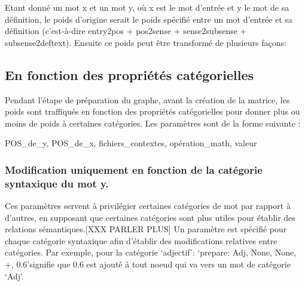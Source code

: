 Etant donné un mot x et un mot y, où x est le mot d'entrée et y le mot de sa 
définition, le poids d'origine serait le poids spécifié entre un mot d'entrée et 
sa définition (c'est-à-dire entry2pos + pos2sense + sense2subsense + 
subsense2deftext). Ensuite ce poids peut être transformé de plusieurs façons:


\subsection{En fonction des propriétés catégorielles}
Pendant l'étape de préparation du graphe, avant la création de la matrice, les 
poids sont traffiqués en fonction des propriétés catégorielles pour donner plus 
ou moins de poids à certaines catégories. Les paramètres sont de la forme 
suivante :
    \begin{framed}
        POS\_de\_y, POS\_de\_x, fichiers\_contextes, opération\_math, valeur
    \end{framed}

\subsubsection{Modification uniquement en fonction de la catégorie 
syntaxique du mot y.}
Ces paramètres servent à privilégier certaines catégories de mot par rapport à 
d'autres, en supposant que certaines catégories sont plus utiles pour établir 
des relations sémantiques.[XXX PARLER PLUS] Un paramètre est spécifié pour 
chaque catégorie syntaxique afin d'établir des modifications relatives entre 
catégories. Par exemple, pour la catégorie \lq{adjectif}\rq: \lq{prepare: Adj, 
None, None, +, 0.6}\rq signifie que 0.6 est ajouté à tout noeud qui va vers un 
mot de catégorie \lq{Adj}\rq.

